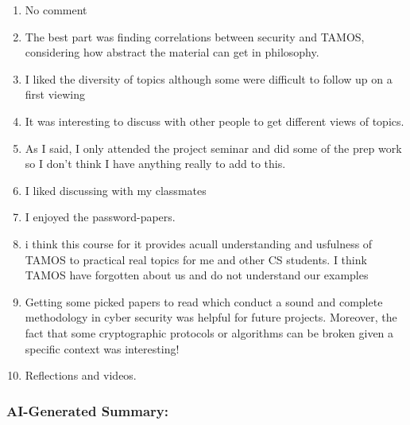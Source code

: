 \documentclass[a4paper]{report}
\begin{document}
\begin{enumerate}
  \item No comment 
  \item The best part was finding correlations between security and TAMOS, considering how abstract the material can get in philosophy. 
  \item I liked the diversity of topics although some were difficult to follow up on a first viewing
  \item It was interesting to discuss with other people to get different views of topics.
  \item As I said, I only attended the project seminar and did some of the prep work so I don't think I have anything really to add to this. 
  \item I liked discussing with my classmates
  \item I enjoyed the password-papers.
  \item i think this course for it provides acuall understanding and usfulness of TAMOS to practical real topics for me and other CS students. I think TAMOS have forgotten about us and do not understand our examples
  \item Getting some picked papers to read which conduct a sound and complete methodology in cyber security was helpful for future projects. Moreover, the fact that some cryptographic protocols or algorithms can be broken given a specific context was interesting!
  \item Reflections and videos.
\end{enumerate}

\subsubsection{AI-Generated Summary:}
\end{document}
